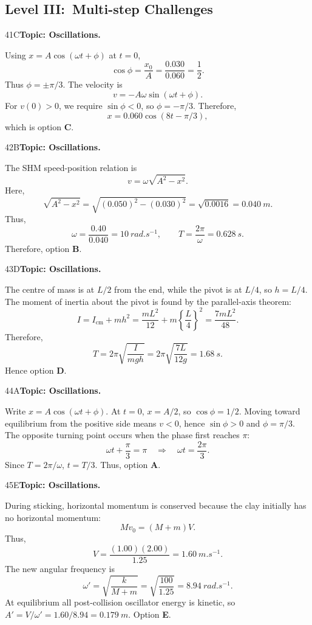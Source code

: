 \documentclass[10pt,a4paper]{physicsquiz}
\begin{document}
\subsection{Level III:\ Multi-step Challenges}
\begin{workedsolution}{41}{C}\textbf{Topic: Oscillations.}\par Using \(x=A\cos(\omega t+\phi)\) at \(t=0\),
  \[
    \cos\phi=\frac{x_0}{A}=\frac{0.030}{0.060}=\frac12.
  \]
  Thus \(\phi=\pm\pi/3\). The velocity is
  \[
    v=-A\omega\sin(\omega t+\phi).
  \]
  For \(v(0)>0\), we require \(\sin\phi<0\), so \(\phi=-\pi/3\). Therefore,
  \[
    x=0.060\cos(8t-\pi/3),
  \]
  which is option \textbf{C}.\end{workedsolution}
\begin{workedsolution}{42}{B}\textbf{Topic: Oscillations.}\par The SHM speed-position relation is
  \[
    v=\omega\sqrt{A^2-x^2}.
  \]
  Here,
  \[
    \sqrt{A^2-x^2}=\sqrt{{(0.050)}^2-{(0.030)}^2}
    =\sqrt{0.0016}=\SI{0.040}{m}.
  \]
  Thus,
  \[
    \omega=\frac{0.40}{0.040}=\SI{10}{rad.s^{-1}},
    \qquad
    T=\frac{2\pi}{\omega}=\SI{0.628}{s}.
  \]
  Therefore, option \textbf{B}.\end{workedsolution}
\begin{workedsolution}{43}{D}\textbf{Topic: Oscillations.}\par The centre of mass is at \(L/2\) from the end, while the pivot is at \(L/4\), so \(h=L/4\). The moment of inertia about the pivot is found by the parallel-axis theorem:
  \[
    I=I_{\mathrm{cm}}+mh^2
    =\frac{mL^2}{12}+m{\left\{\frac{L}{4}\right\}}^2
    =\frac{7mL^2}{48}.
  \]
  Therefore,
  \[
    T=2\pi\sqrt{\frac{I}{mgh}}
    =2\pi\sqrt{\frac{7L}{12g}}
    =\SI{1.68}{s}.
  \]
  Hence option \textbf{D}.\end{workedsolution}
\begin{workedsolution}{44}{A}\textbf{Topic: Oscillations.}\par Write \(x=A\cos(\omega t+\phi)\). At \(t=0\), \(x=A/2\), so \(\cos\phi=1/2\). Moving toward equilibrium from the positive side means \(v<0\), hence \(\sin\phi>0\) and \(\phi=\pi/3\). The opposite turning point occurs when the phase first reaches \(\pi\):
  \[
    \omega t+\frac{\pi}{3}=\pi
    \quad\Rightarrow\quad
    \omega t=\frac{2\pi}{3}.
  \]
  Since \(T=2\pi/\omega\), \(t=T/3\). Thus, option \textbf{A}.\end{workedsolution}
\begin{workedsolution}{45}{E}\textbf{Topic: Oscillations.}\par During sticking, horizontal momentum is conserved because the clay initially has no horizontal momentum:
  \[
    Mv_0=(M+m)V.
  \]
  Thus,
  \[
    V=\frac{(1.00)(2.00)}{1.25}=\SI{1.60}{m.s^{-1}}.
  \]
  The new angular frequency is
  \[
    \omega'=\sqrt{\frac{k}{M+m}}=\sqrt{\frac{100}{1.25}}=\SI{8.94}{rad.s^{-1}}.
  \]
  At equilibrium all post-collision oscillator energy is kinetic, so \(A'=V/\omega'=1.60/8.94=\SI{0.179}{m}\). Option \textbf{E}.\end{workedsolution}
\end{document}
